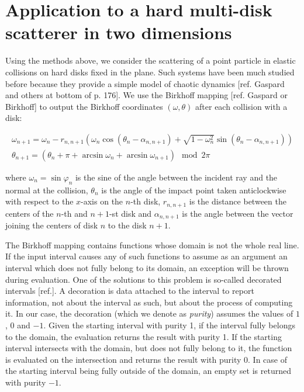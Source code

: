 \documentclass[pre, amsmath, amssymb, onecolumn, showpacs]{revtex4-1}
\begin{document}
\section{Application to a hard multi-disk scatterer in two dimensions}

Using the methods above, we consider the scattering of a point particle in elastic collisions on hard disks fixed in the plane. Such systems have been much studied before because they provide a simple model of chaotic dynamics [ref. Gaspard and others at bottom of p. 176]. We use the Birkhoff mapping [ref. Gaspard or Birkhoff] to output the Birkhoff coordinates $(\omega, \theta)$ after each collision with a disk:

\begin{equation}
\begin{split}
\omega_{n+1} = \omega_n - r_{n, n+1} (\omega_n \cos(\theta_n - \alpha_{n, n+1}) + \sqrt{1 - \omega_n^2} \sin(\theta_n - \alpha_{n, n+1})) \\
\theta_{n+1} = (\theta_n + \pi + \arcsin \omega_n + \arcsin \omega_{n+1}) \mod 2 \pi
\end{split}
\end{equation}

where $\omega_n = \sin \varphi_n$ is the sine of the angle between the incident ray and the normal at the collision, $\theta_n$ is the angle of the impact point taken anticlockwise with respect to the $x$-axis on the $n$-th disk, $r_{n, n+1}$ is the distance between the centers of the $n$-th and $n+1$-st disk and $\alpha_{n, n+1}$ is the angle between the vector joining the centers of disk $n$ to the disk $n+1$.

The Birkhoff mapping contains functions whose domain is not the whole real line. If the input interval causes any of such functions to assume as an argument an interval which does not fully belong to its domain, an exception will be thrown during evaluation. One of the solutions to this problem is so-called decorated intervals [ref.]. A decoration is data attached to the interval to report information, not about the interval as such, but about the process of computing it. In our case, the decoration (which we denote as \textit{purity}) assumes the values of $1$, $0$ and $-1$. Given the starting interval with purity 1, if the interval fully belongs to the domain, the evaluation returns the result with purity 1. If the starting interval intersects with the domain, but does not fully belong to it, the function is evaluated on the intersection and returns the result with purity 0. In case of the starting interval being fully outside of the domain, an empty set is returned with purity $-1$.
\end{document}
